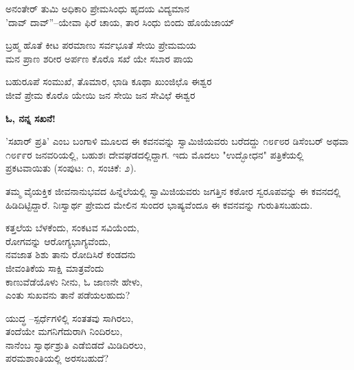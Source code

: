 
\begin{myquote}
ಅನಂತೇರ್ ತುಮಿ ಅಧಿಕಾರಿ ಪ್ರೇಮಸಿಂಧು ಹೃದಯ ವಿದ್ಯಮಾನ\\'ದಾವ್ ದಾವ್''–ಯೇವಾ ಫಿರೆ ಚಾಯ, ತಾರ ಸಿಂಧು ಬಿಂದು ಹೊಯೆಜಾಯ್
\end{myquote}


\begin{myquote}
ಬ್ರಹ್ಮ ಹೊತೆ ಕೀಟ ಪರಮಾಣು ಸರ್ವಭೂತೆ ಸೇಯಿ ಪ್ರೇಮಮಯ\\ಮನ ಪ್ರಾಣ ಶರೀರ ಅರ್ಪಣ ಕೊರೊ ಸಖೆ ಯೇ ಸಬಾರ ಪಾಯ
\end{myquote}


\begin{myquote}
ಬಹುರೂಪೆ ಸಂಮುಖೆ, ತೊಮಾರ, ಛಾಡಿ ಕೂಥಾ ಖುಂಜಿಛೊ ಈಶ್ವರ\\ಜೀವೆ ಪ್ರೇಮ ಕೊರೊ ಯೇಯಿ ಜನ ಸೇಯಿ ಜನ ಸೇವಿಛೆ ಈಶ್ವರ
\end{myquote}


\begin{center}
\textbf{ಓ, ನನ್ನ ಸಖನೆ!}
\end{center}

'ಸಖಾರ್ ಪ್ರತಿ' ಎಂಬ ಬಂಗಾಳಿ ಮೂಲದ ಈ ಕವನವನ್ನು ಸ್ವಾಮಿಜಿಯವರು ಬರೆದದ್ದು ೧೮೯೮ರ ಡಿಸೆಂಬರ್ ಅಥವಾ ೧೮೯೯ರ ಜನವರಿಯಲ್ಲಿ, ಬಹುಶಃ ದೇವಘಡದಲ್ಲಿದ್ದಾಗ. ಇದು ಮೊದಲು "ಉದ್ಭೋಧನ" ಪತ್ರಿಕೆಯಲ್ಲಿ ಪ್ರಕಟವಾಯಿತು (ಸಂಪುಟ: ೧, ಸಂಚಿಕೆ: ೨).

ತಮ್ಮ ವೈಯಕ್ತಿಕ ಜೀವನಾನುಭವದ ಹಿನ್ನೆಲೆಯಲ್ಲಿ ಸ್ವಾಮಿಜಿಯವರು ಜಗತ್ತಿನ ಕಠೋರ ಸ್ವರೂಪವನ್ನು ಈ ಕವನದಲ್ಲಿ ಹಿಡಿದಿಟ್ಟಿದ್ದಾರೆ. ನಿಃಸ್ವಾರ್ಥ ಪ್ರೇಮದ ಮೇಲಿನ ಸುಂದರ ಭಾಷ್ಯವೆಂದೂ ಈ ಕವನವನ್ನು ಗುರುತಿಸಬಹುದು.

\begin{myquote}
ಕತ್ತಲೆಯ ಬೆಳಕೆಂದು, ಸಂಕಟವ ಸವಿಯೆಂದು,\\ರೋಗವನ್ನು ಆರೋಗ್ಯಭಾಗ್ಯವೆಂದು,\\ನವಜಾತ ಶಿಶು ತಾನು ರೋದಿಸಿರೆ ಕಂಡದನು\\ಜೀವಂತಿಕೆಯ ಸಾಕ್ಷಿ ಮಾತ್ರವೆಂದು\\ಕಾಣುವೆಡೆಯೊಳು ನೀನು, ಓ ಜಾಣನೇ ಹೇಳು,\\ಎಂತು ಸುಖವನು ತಾನೆ ಪಡೆಯಲಹುದು?
\end{myquote}

\begin{myquote}
ಯುದ್ಧ –ಸ್ಪರ್ಧೆಗಳಿಲ್ಲಿ ಸಂತತವು ಸಾಗಿರಲು,\\ತಂದೆಯೇ ಮಗನಿಗೆದುರಾಗಿ ನಿಂದಿರಲು,\\ನಾನೆಂಬ ಸ್ವಾರ್ಥಶ್ರುತಿ ಎಡೆಬಿಡದೆ ಮಿಡಿದಿರಲು,\\ಪರಮಶಾಂತಿಯಲ್ಲಿ ಅರಸಬಹುದೆ? 
\end{myquote}

